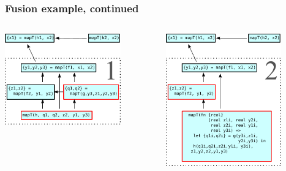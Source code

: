 \documentclass[rgb,dvipsnames]{beamer}
\begin{document}
\begin{frame}[t]
  \frametitle{Fusion example, continued}

  \centering
  \begin{columns}
    \begin{column}[T]{0.48\textwidth}
      \includegraphics[width=5cm]{img/fusion-1.pdf}
    \end{column}\hfill
    \begin{column}[T]{0.48\textwidth}
      \includegraphics[width=5cm]{img/fusion-2.pdf}
    \end{column}
  \end{columns}

\end{frame}
\end{document}
